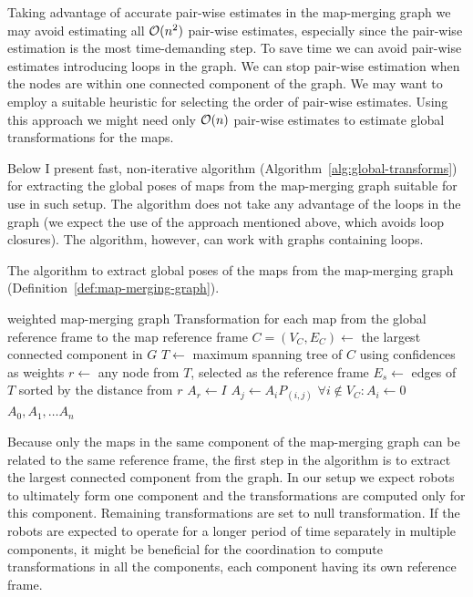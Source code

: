 Taking advantage of accurate pair-wise estimates in the map-merging graph we may avoid estimating all $\operatorname{\mathcal{O}}(n^2)$ pair-wise estimates, especially since the pair-wise estimation is the most time-demanding step. To save time we can avoid pair-wise estimates introducing loops in the graph. We can stop pair-wise estimation when the nodes are within one connected component of the graph. We may want to employ a suitable heuristic for selecting the order of pair-wise estimates. Using this approach we might need only $\operatorname{\mathcal{O}}(n)$ pair-wise estimates to estimate global transformations for the maps.

Below I present fast, non-iterative algorithm (Algorithm~\ref{alg:global-transforms}) for extracting the global poses of maps from the map-merging graph suitable for use in such setup. The algorithm does not take any advantage of the loops in the graph (we expect the use of the approach mentioned above, which avoids loop closures). The algorithm, however, can work with graphs containing loops.

\begin{algorithm}
    \caption[Global poses extraction]{The algorithm to extract global poses of the maps from the map-merging graph (Definition~\ref{def:map-merging-graph}).}
    \label{alg:global-transforms}
    \begin{algorithmic}[1]
        \Require weighted map-merging graph
        \Ensure Transformation for each map from the global reference frame to the map reference frame
            \State $C = (V_C, E_C) \gets$ the largest connected component in $G$
            \State $T \gets$ maximum spanning tree of $C$ using confidences as weights
            \State $r \gets$ any node from $T$, selected as the reference frame
            \State $E_s \gets$ edges of $T$ sorted by the distance from $r$
            \State $A_r \gets I$
                \State $A_j \gets A_i P_{(i,j)}$
            \EndFor
            \State $\forall i \not\in V_C: A_i \gets 0$
            \State \Return $A_0, A_1, \dots A_n$
        \EndFunction
    \end{algorithmic}
\end{algorithm}

Because only the maps in the same component of the map-merging graph can be related to the same reference frame, the first step in the algorithm is to extract the largest connected component from the graph. In our setup we expect robots to ultimately form one component and the transformations are computed only for this component. Remaining transformations are set to null transformation. If the robots are expected to operate for a longer period of time separately in multiple components, it might be beneficial for the coordination to compute transformations in all the components, each component having its own reference frame.

